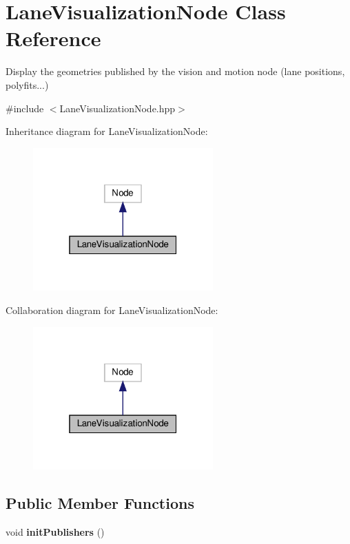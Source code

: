 \hypertarget{classLaneVisualizationNode}{}\section{Lane\+Visualization\+Node Class Reference}
\label{classLaneVisualizationNode}


Display the geometries published by the vision and motion node (lane positions, polyfits...)  




{\ttfamily \#include $<$Lane\+Visualization\+Node.\+hpp$>$}



Inheritance diagram for Lane\+Visualization\+Node\+:
\nopagebreak
\begin{figure}[H]
\begin{center}
\leavevmode
\includegraphics[width=196pt]{classLaneVisualizationNode__inherit__graph}
\end{center}
\end{figure}


Collaboration diagram for Lane\+Visualization\+Node\+:
\nopagebreak
\begin{figure}[H]
\begin{center}
\leavevmode
\includegraphics[width=196pt]{classLaneVisualizationNode__coll__graph}
\end{center}
\end{figure}
\subsection*{Public Member Functions}
\begin{DoxyCompactItemize}
\item 
\mbox{\label{classLaneVisualizationNode_adfe0bf0212e85e99558d4b7ce462383d}} 
void {\bfseries init\+Publishers} ()
\end{DoxyCompactItemize}
